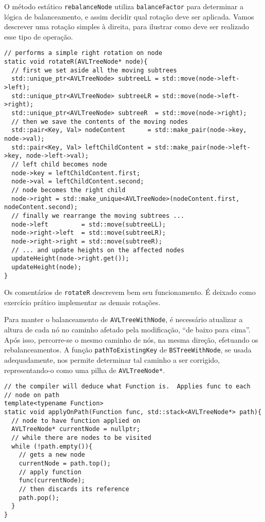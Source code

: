 \documentclass[11pt]{article}
\begin{document}
O método estático \texttt{rebalanceNode} utiliza \texttt{balanceFactor} para
determinar a lógica de balanceamento, e assim decidir qual rotação
deve ser aplicada.  Vamos descrever uma rotação simples à direita,
para ilustrar como deve ser realizado esse tipo de operação.

\pagebreak

\begin{verbatim}
// performs a simple right rotation on node
static void rotateR(AVLTreeNode* node){
  // first we set aside all the moving subtrees
  std::unique_ptr<AVLTreeNode> subtreeLL = std::move(node->left->left);
  std::unique_ptr<AVLTreeNode> subtreeLR = std::move(node->left->right);
  std::unique_ptr<AVLTreeNode> subtreeR  = std::move(node->right);
  // then we save the contents of the moving nodes
  std::pair<Key, Val> nodeContent      = std::make_pair(node->key, node->val);
  std::pair<Key, Val> leftChildContent = std::make_pair(node->left->key, node->left->val);
  // left child becomes node
  node->key = leftChildContent.first;
  node->val = leftChildContent.second;
  // node becomes the right child
  node->right = std::make_unique<AVLTreeNode>(nodeContent.first, nodeContent.second);
  // finally we rearrange the moving subtrees ...
  node->left         = std::move(subtreeLL);
  node->right->left  = std::move(subtreeLR);
  node->right->right = std::move(subtreeR);
  // ... and update heights on the affected nodes
  updateHeight(node->right.get());
  updateHeight(node);
}
\end{verbatim}

Os comentários de \texttt{rotateR} descrevem bem seu funcionamento.  É
deixado como exercício prático implementar as demais rotações.

Para manter o balanceamento de \texttt{AVLTreeWithNode}, é necessário
atualizar a altura de cada nó no caminho afetado pela modificação,
``de baixo para cima''.  Após isso, percorre-se o mesmo caminho de
nós, na mesma direção, efetuando os rebalanceamentos.  A função
\texttt{pathToExistingKey} de \texttt{BSTreeWithNode}, se usada adequadamente,
nos permite determinar tal caminho a ser corrigido,
representando-o como uma pilha de \texttt{AVLTreeNode*}.

\begin{verbatim}
// the compiler will deduce what Function is.  Applies func to each
// node on path
template<typename Function>
static void applyOnPath(Function func, std::stack<AVLTreeNode*> path){
  // node to have function applied on
  AVLTreeNode* currentNode = nullptr;
  // while there are nodes to be visited
  while (!path.empty()){
    // gets a new node
    currentNode = path.top();
    // apply function
    func(currentNode);
    // then discards its reference
    path.pop();
  }
}
\end{verbatim}
\end{document}
